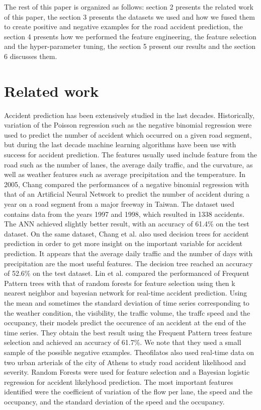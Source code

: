\documentclass[conference]{IEEEtran}
\begin{document}
The rest of this paper is organized as follows: section 2 presents the related work of this paper, the section 3 presents the datasets we used and how we fused them to create positive and negative examples for the road accident prediction, the section 4 presents how we performed the feature engineering, the feature selection and the hyper-parameter tuning, the section 5 present our results and the section 6 discusses them.

\section{Related work}
Accident prediction has been extensively studied in the last decades. Historically, variation of the Poisson regression such as the negative binomial regression were used to predict the number of accident which occurred on a given road segment, but during the last decade machine learning algorithms have been use with success for accident prediction. The features usually used include feature from the road such as the number of lanes, the average daily traffic, and the curvature, as well as weather features such as average precipitation and the temperature. In 2005, Chang \cite{Change2005} compared the performances of a negative binomial regression with that of an Artificial Neural Network to predict the number of accident during a year on a road segment from a major freeway in Taiwan. The dataset used contains data from the years 1997 and 1998, which resulted in 1338 accidents. The ANN achieved slightly better result, with an accuracy of 61.4\% on the test dataset. On the same dataset, Chang et al.\cite{Chang2005b} also used decision trees for accident prediction in order to get more insight on the important variable for accident prediction. It appears that the average daily traffic and the number of days with precipitation are the most useful features. The decision tree reached an accuracy of 52.6\% on the test dataset. Lin et al. \cite{Lin2015} compared the performanced of Frequent Pattern trees with that of random forests for feature selection using then k nearest neighbor and bayesian network for real-time accident prediction. Using the mean and sometimes the standard deviation of time series corresponding to the weather condition, the visibility, the traffic volume, the traffc speed and the occupancy, their models predict the occurence of an accident at the end of the time series. They obtain the best result using the Frequent Pattern trees feature selection and achieved an accuracy of 61.7\%. We note that they used a small sample of the possible negative examples. Theofilatos\cite{Theofilatos2017} also used real-time data on two urban arterials of the city of Athens to study road accident likelihood and severity. Random Forests were used for feature selection and a Bayesian logistic regression for accident likelyhood prediction. The most important features identified were the coefficient of variation of the flow per lane, the speed and the occupancy, and the standard deviation of the speed and the occupancy.
\end{document}

